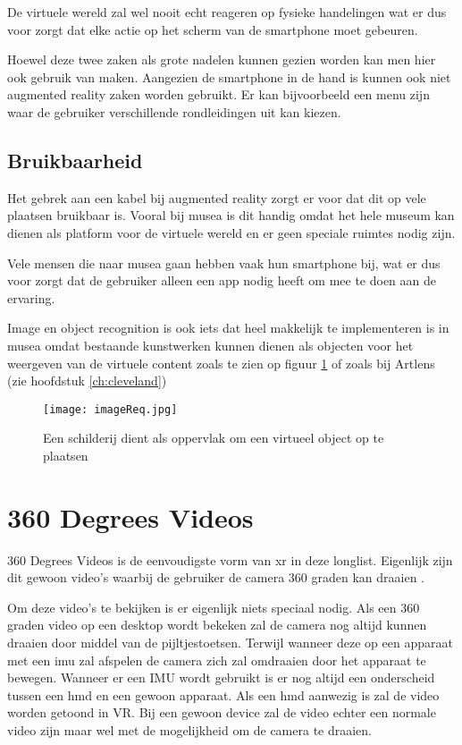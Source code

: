 De virtuele wereld zal wel nooit echt reageren op fysieke handelingen wat er dus voor zorgt dat elke actie op het scherm van de smartphone moet gebeuren.

Hoewel deze twee zaken als grote nadelen kunnen gezien worden kan men hier ook gebruik van maken. Aangezien de smartphone in de hand is kunnen ook niet augmented reality zaken worden gebruikt. Er kan bijvoorbeeld een menu zijn waar de gebruiker verschillende rondleidingen uit kan kiezen.

\subsection{Bruikbaarheid}
Het gebrek aan een kabel bij augmented reality zorgt er voor dat dit op vele plaatsen bruikbaar is. Vooral bij musea is dit handig omdat het hele museum kan dienen als platform voor de virtuele wereld en er geen speciale ruimtes nodig zijn.

Vele mensen die naar musea gaan hebben vaak hun smartphone bij, wat er dus voor zorgt dat de gebruiker alleen een app nodig heeft om mee te doen aan de ervaring.

Image en object recognition is ook iets dat heel makkelijk te implementeren is in musea omdat bestaande kunstwerken kunnen dienen als objecten voor het weergeven van de virtuele content zoals te zien op figuur \ref{fig:imageReq} of zoals bij Artlens (zie hoofdstuk \ref{ch:cleveland})

\begin{figure}
    \texttt{[image: imageReq.jpg]}
    \caption{Een schilderij dient als oppervlak om een virtueel object op te plaatsen \autocite{ARCO2017}}
    \label{fig:imageReq}
\end{figure}

\section{360 Degrees Videos}
360 Degrees Videos is de eenvoudigste vorm van \acrlong{xr} in deze longlist. Eigenlijk zijn dit gewoon video's waarbij de gebruiker de camera 360 graden kan draaien \autocite{Hosseini2016}.

Om deze video's te bekijken is er eigenlijk niets speciaal nodig. Als een 360 graden video op een desktop wordt bekeken zal de camera nog altijd kunnen draaien door middel van de pijltjestoetsen. Terwijl wanneer deze op een apparaat met een \acrshort{imu} zal afspelen de camera zich zal omdraaien door het apparaat te bewegen. Wanneer er een IMU wordt gebruikt is er nog altijd een onderscheid tussen een \acrshort{hmd} en een gewoon apparaat. Als een \acrshort{hmd} aanwezig is zal de video worden getoond in VR. Bij een gewoon device zal de video echter een normale video zijn maar wel met de mogelijkheid om de camera te draaien.

